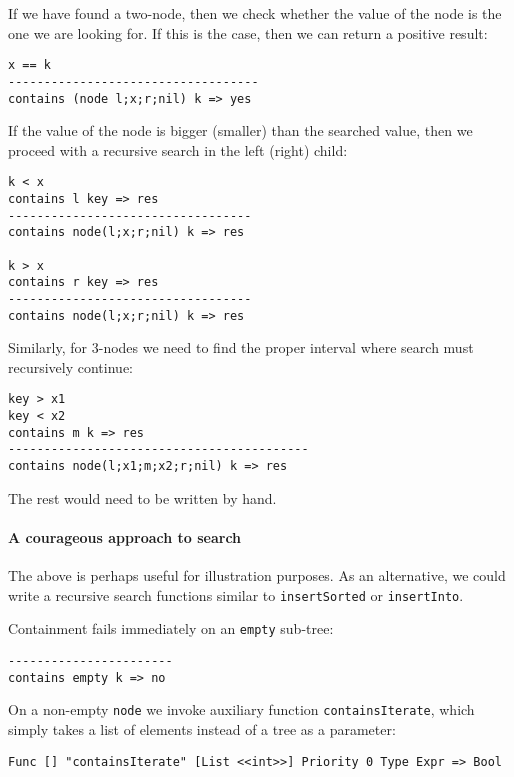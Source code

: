 If we have found a two-node, then we check whether the value of the node is the one we are looking for. If this is the case, then we can return a positive result:

\begin{lstlisting}
x == k
-----------------------------------
contains (node l;x;r;nil) k => yes
\end{lstlisting}

If the value of the node is bigger (smaller) than the searched value, then we proceed with a recursive search in the left (right) child:

\begin{lstlisting}
k < x
contains l key => res
----------------------------------
contains node(l;x;r;nil) k => res

k > x
contains r key => res
----------------------------------
contains node(l;x;r;nil) k => res
\end{lstlisting}

Similarly, for 3-nodes we need to find the proper interval where search must recursively continue:

\begin{lstlisting}
key > x1
key < x2
contains m k => res
------------------------------------------
contains node(l;x1;m;x2;r;nil) k => res
\end{lstlisting}

The rest would need to be written by hand.

\paragraph{A courageous approach to search}
The above is perhaps useful for illustration purposes. As an alternative, we could write a recursive search functions similar to \texttt{insertSorted} or \texttt{insertInto}.

Containment fails immediately on an \texttt{empty} sub-tree:

\begin{lstlisting}
-----------------------
contains empty k => no
\end{lstlisting}

On a non-empty \texttt{node} we invoke auxiliary function \texttt{containsIterate}, which simply takes a list of elements instead of a tree as a parameter:

\begin{lstlisting}
Func [] "containsIterate" [List <<int>>] Priority 0 Type Expr => Bool
\end{lstlisting}

